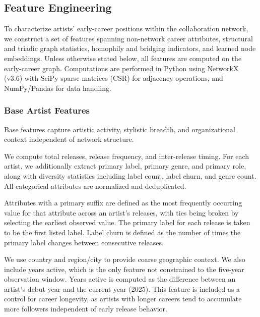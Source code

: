 \documentclass[fleqn,10pt]{wlscirep}
\begin{document}
\subsection*{Feature Engineering}

To characterize artists’ early-career positions within the collaboration network, we construct a set of features spanning non-network career attributes, structural and triadic graph statistics, homophily and bridging indicators, and learned node embeddings. Unless otherwise stated below, all features are computed on the early-career graph. Computations are performed in Python using NetworkX (v3.6) with SciPy sparse matrices (CSR) for adjacency operations, and NumPy/Pandas for data handling.

\subsubsection*{Base Artist Features}
Base features capture artistic activity, stylistic breadth, and organizational context independent of network structure.

We compute total releases, release frequency, and inter-release timing. For each artist, we additionally extract primary label, primary genre, and primary role, along with diversity statistics including label count, label churn, and genre count. All categorical attributes are normalized and deduplicated.

Attributes with a primary suffix are defined as the most frequently occurring value for that attribute across an artist’s releases, with ties being broken by selecting the earliest observed value. The primary label for each release is taken to be the first listed label. Label churn is defined as the number of times the primary label changes between consecutive releases.

We use country and region/city to provide coarse geographic context. We also include years active, which is the only feature not constrained to the five-year observation window. Years active is computed as the difference between an artist’s debut year and the current year (2025). This feature is included as a control for career longevity, as artists with longer careers tend to accumulate more followers independent of early release behavior. 
\end{document}

